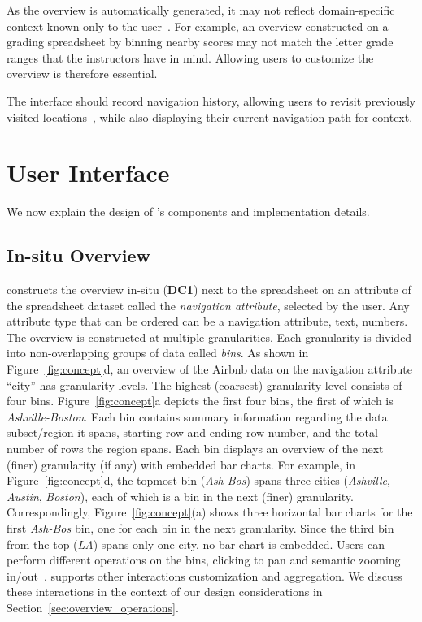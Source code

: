As the overview is automatically generated,
it may not reflect domain-specific context
known only to the user~\cite{Raman99scalablespreadsheets}.
For example, an overview constructed on a grading
spreadsheet by binning nearby scores
may not match the letter grade ranges
that the instructors have in mind.
Allowing users to customize the overview is therefore essential.

The interface should record navigation history,
allowing users to revisit previously visited locations~\cite{shneiderman2003eyes},
while also displaying their current navigation path for context.

\section{User Interface}
\label{sec:ui}
We now explain the design of \noah's components
and implementation details.

\subsection{In-situ Overview}

\noah constructs the overview in-situ ({\bf DC1})
next to the spreadsheet
on an attribute of the spreadsheet dataset
called the {\em navigation attribute},
selected by the user.
Any attribute type that can be ordered
can be a navigation attribute, \eg
text, numbers.
The overview is constructed at multiple granularities.
Each granularity is divided into non-overlapping
groups of data called {\em bins}.
As shown in Figure~\ref{fig:concept}d,
an overview of the Airbnb data
on the navigation attribute ``city''
has granularity levels.
The highest (coarsest) granularity level
consists of four bins.
Figure~\ref{fig:concept}a
depicts the first four bins,
the first of which is {\em Ashville-Boston}.
Each bin contains summary information
regarding the data subset/region
it spans, \eg starting row and
ending row number, and 
the total number of rows the region spans.
Each bin displays an overview
of the next (finer) granularity (if any)
with embedded bar charts.
For example, in Figure~\ref{fig:concept}d,
the topmost bin ({\em Ash-Bos}) spans three cities
({\em Ashville}, {\em Austin}, {\em Boston}), each of which is a bin
in the next (finer) granularity.
Correspondingly, Figure~\ref{fig:concept}(a)
shows three horizontal bar charts for the
first {\em Ash-Bos} bin,
one for each bin in the next granularity.
Since the third bin from the top
(\emph{LA}) spans only one city,
no bar chart is embedded.
Users can perform different
operations on the bins, \eg clicking to pan and
semantic zooming in/out~\cite{perlin1993pad}.
\noah supports other interactions 
\eg customization and aggregation.
We discuss these interactions
in the context of our design considerations in Section~\ref{sec:overview_operations}.

